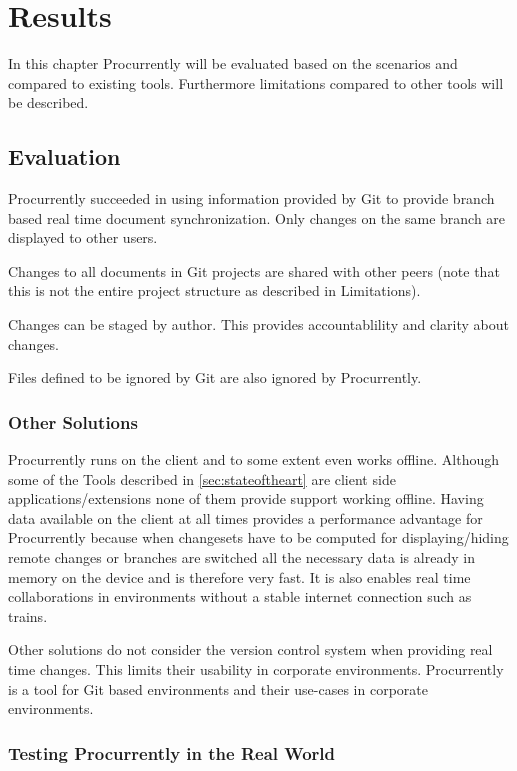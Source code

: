 \chapter{Results}
\label{sec:results}

In this chapter Procurrently will be evaluated based on the scenarios and compared to existing tools.
Furthermore limitations compared to other tools will be described.

\section{Evaluation}
Procurrently succeeded in using information provided by Git to provide branch based real time document synchronization. Only changes on the same branch are displayed to other users.

Changes to all documents in Git projects are shared with other peers (note that this is not the entire project structure as described in Limitations).

Changes can be staged by author. This provides accountablility and clarity about changes.

Files defined to be ignored by Git are also ignored by Procurrently.

\subsection{Other Solutions}
Procurrently runs on the client and to some extent even works offline. Although some of the Tools described in \ref{sec:stateoftheart} are client side applications/extensions none of them provide support working offline. Having data available on the client at all times provides a performance advantage for Procurrently because when changesets have to be computed for displaying/hiding remote changes or branches are switched all the necessary data is already in memory on the device and is therefore very fast. It is also enables real time collaborations in environments without a stable internet connection such as trains.

Other solutions do not consider the version control system when providing real time changes. This limits their usability in corporate environments. Procurrently is a tool for Git based environments and their use-cases in corporate environments. 

\subsection{Testing Procurrently in the Real World}

